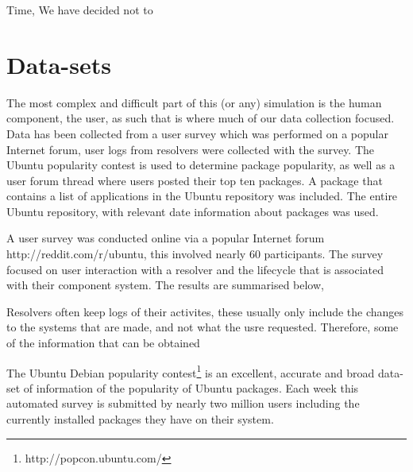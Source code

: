 Time, We have decided not to 

\section{Data-sets}
The most complex and difficult part of this (or any) simulation is the human component, the user,
as such that is where much of our data collection focused.
Data has been collected from
a user survey which was performed on a popular Internet forum,
user logs from resolvers were collected with the survey.
The Ubuntu popularity contest is used to determine package popularity,
as well as a user forum thread where users posted their top ten packages.
A package that contains a list of applications in the Ubuntu repository was included.
The entire Ubuntu repository, with relevant date information about packages was used.

A user survey was conducted online via a popular Internet forum http://reddit.com/r/ubuntu, this involved nearly 60 participants. %
The survey focused on user interaction with a resolver and the lifecycle that is associated with their component system.
The results are summarised below, %

Resolvers often keep logs of their activites, these usually only include the changes to the systems that are made, and not what the usre requested.
Therefore, some of the information that can be obtained

The Ubuntu Debian popularity contest\footnote{http://popcon.ubuntu.com/} is an excellent, accurate and broad data-set of information of the popularity of Ubuntu packages.
Each week this automated survey is submitted by nearly two million users including the currently installed packages they have on their system.



